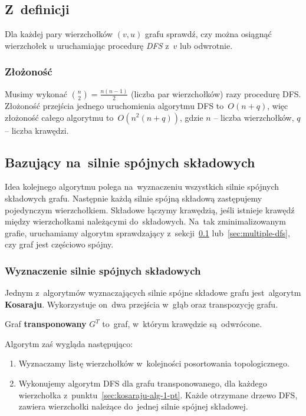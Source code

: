 \documentclass[a4paper,12pt]{mwart}
\begin{document}
\subsection{Z~definicji}
\label{sec:from-definion-alg}

Dla każdej pary wierzchołków $(v, u)$ grafu sprawdź, czy można osiągnąć
wierzchołek $u$ uruchamiając procedurę \emph{DFS} z~$v$ lub odwrotnie.

\subsubsection{Złożoność}

Musimy wykonać ${n \choose 2} = \frac{n(n - 1)}{2}$ (liczba par wierzchołków)
razy procedurę DFS\@. Złożoność przejścia jednego uruchomienia algorytmu DFS
to~$O(n + q)$, więc złożoność całego algorytmu to~$O(n^2(n + q))$, gdzie $n$ --
liczba wierzchołków, $q$ -- liczba krawędzi.

\subsection{Bazujący na~silnie spójnych składowych}

Idea kolejnego algorytmu polega na~wyznaczeniu wszystkich silnie spójnych
składowych grafu. Następnie każdą silnie spójną składową zastępujemy
pojedynczym wierzchołkiem. Składowe łączymy krawędzią, jeśli istnieje krawędź
między wierzchołkami należącymi do~składowych. Na~tak zminimalizowanym grafie,
uruchamiamy algorytm sprawdzający z~sekcji~\ref{sec:from-definion-alg}
lub~\ref{sec:multiple-dfs}, czy graf jest częściowo spójny.


\subsubsection{Wyznaczenie silnie spójnych składowych}

Jednym z~algorytmów wyznaczających silnie spójne składowe grafu jest~algorytm
\textbf{Kosaraju}. Wykorzystuje on~dwa przejścia w~głąb oraz transpozycję
grafu.

Graf \textbf{transponowany} $G^T$ to~graf, w~którym krawędzie są~odwrócone.

Algorytm zaś wygląda następująco:

\begin{enumerate}
\item\label{sec:kosaraju-alg-1-pt} Wyznaczamy listę wierzchołków w~kolejności
  posortowania topologicznego.
\item\label{sec:kosaraju-alg-2-pt} Wykonujemy algorytm DFS dla grafu
  transponowanego, dla każdego wierzchołka
  z~punktu~\ref{sec:kosaraju-alg-1-pt}. Każde otrzymane drzewo DFS, zawiera
  wierzchołki należące do~jednej silnie spójnej składowej.
\end{enumerate}
\end{document}
